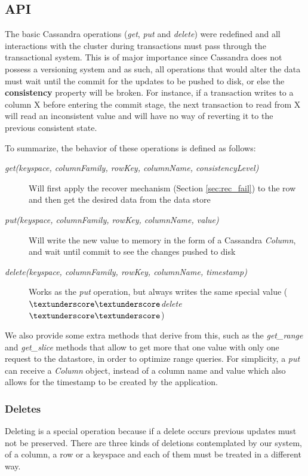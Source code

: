 \subsection{API}
The basic Cassandra operations (\emph{get}, \emph{put} and \emph{delete}) were redefined and all interactions with the cluster during transactions must pass through the transactional system. This is of major importance since Cassandra does not possess a versioning system and as such, all operations that would alter the data must wait until the commit for the updates to be pushed to disk, or else the \textbf{consistency} property will be broken. For instance, if a transaction writes to a column X before entering the commit stage, the next transaction to read from X will read an inconsistent value and will have no way of reverting it to the previous consistent state.

To summarize, the behavior of these operations is defined as follows:

\begin{description}
	\item[\emph{get(keyspace, columnFamily, rowKey, columnName, consistencyLevel)}] Will first apply the recover mechanism (Section \ref{sec:rec_fail}) to the row and then get the desired data from the data store
	\item[\emph{put(keyspace, columnFamily, rowKey, columnName, value)}] Will write the new value to memory in the form of a Cassandra \emph{Column}, and wait until commit to see the changes pushed to disk
	\item[\emph{delete(keyspace, columnFamily, rowKey, columnName, timestamp)}] Works as the \emph{put} operation, but always writes the same special value (\emph{$\textunderscore\textunderscore$delete$\textunderscore\textunderscore$}) 
\end{description}  

We also provide some extra methods that derive from this, such as the \emph{get\_range} and \emph{get\_slice} methods that allow to get more that one value with only one request to the datastore, in order to optimize range queries. For simplicity, a \emph{put} can receive a \emph{Column} object, instead of a column name and value which also allows for the timestamp to be created by the application.

\subsubsection{Deletes}
Deleting is a special operation because if a delete occurs previous updates must not be preserved. There are three kinds of deletions contemplated by our system, of a column, a row or a keyspace and each of them must be treated in a different way.


